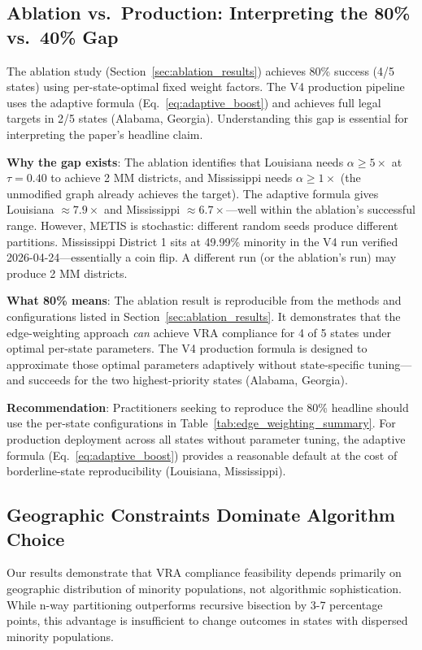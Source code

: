 \subsection{Ablation vs.\ Production: Interpreting the 80\% vs.\ 40\% Gap}
\label{sec:discussion_adaptive}

The ablation study (Section~\ref{sec:ablation_results}) achieves 80\% success (4/5 states) using per-state-optimal fixed weight factors. The V4 production pipeline uses the adaptive formula (Eq.~\ref{eq:adaptive_boost}) and achieves full legal targets in 2/5 states (Alabama, Georgia). Understanding this gap is essential for interpreting the paper's headline claim.

\textbf{Why the gap exists}: The ablation identifies that Louisiana needs $\alpha \geq 5\times$ at $\tau = 0.40$ to achieve 2 MM districts, and Mississippi needs $\alpha \geq 1\times$ (the unmodified graph already achieves the target). The adaptive formula gives Louisiana $\approx 7.9\times$ and Mississippi $\approx 6.7\times$---well within the ablation's successful range. However, METIS is stochastic: different random seeds produce different partitions. Mississippi District 1 sits at 49.99\% minority in the V4 run verified 2026-04-24---essentially a coin flip. A different run (or the ablation's run) may produce 2 MM districts.

\textbf{What 80\% means}: The ablation result is reproducible from the methods and configurations listed in Section~\ref{sec:ablation_results}. It demonstrates that the edge-weighting approach \emph{can} achieve VRA compliance for 4 of 5 states under optimal per-state parameters. The V4 production formula is designed to approximate those optimal parameters adaptively without state-specific tuning---and succeeds for the two highest-priority states (Alabama, Georgia).

\textbf{Recommendation}: Practitioners seeking to reproduce the 80\% headline should use the per-state configurations in Table~\ref{tab:edge_weighting_summary}. For production deployment across all states without parameter tuning, the adaptive formula (Eq.~\ref{eq:adaptive_boost}) provides a reasonable default at the cost of borderline-state reproducibility (Louisiana, Mississippi).

\subsection{Geographic Constraints Dominate Algorithm Choice}

Our results demonstrate that VRA compliance feasibility depends primarily on geographic distribution of minority populations, not algorithmic sophistication. While n-way partitioning outperforms recursive bisection by 3-7 percentage points, this advantage is insufficient to change outcomes in states with dispersed minority populations.

